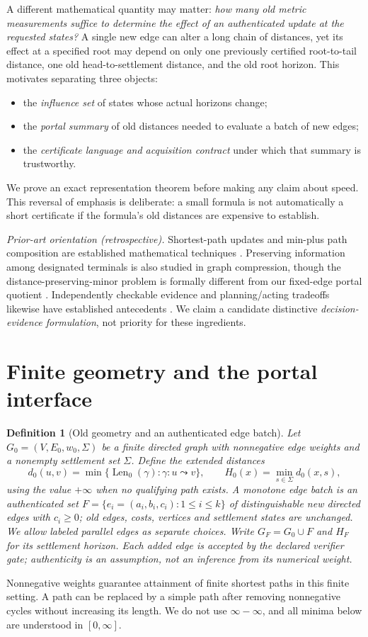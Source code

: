 \documentclass[11pt,letterpaper]{article}
\newtheorem{definition}[theorem]{Definition}
\newcommand{\INF}{+\infty}
\begin{document}
A different mathematical quantity may matter: \emph{how many old metric measurements suffice to determine the effect of an authenticated update at the requested states?} A single new edge can alter a long chain of distances, yet its effect at a specified root may depend on only one previously certified root-to-tail distance, one old head-to-settlement distance, and the old root horizon. This motivates separating three objects:
\begin{itemize}
\item the \emph{influence set} of states whose actual horizons change;
\item the \emph{portal summary} of old distances needed to evaluate a batch of new edges;
\item the \emph{certificate language and acquisition contract} under which that summary is trustworthy.
\end{itemize}
We prove an exact representation theorem before making any claim about speed. This reversal of emphasis is deliberate: a small formula is not automatically a short certificate if the formula's old distances are expensive to establish.

\textit{Prior-art orientation (retrospective).} Shortest-path updates and min-plus path composition are established mathematical techniques \cite{Bellman,Mohri,Dynamic,Demetrescu}. Preserving information among designated terminals is also studied in graph compression, though the distance-preserving-minor problem is formally different from our fixed-edge portal quotient \cite{Krauthgamer}. Independently checkable evidence and planning/acting tradeoffs likewise have established antecedents \cite{Necula,Mugdan,Shekhar,Russell}. We claim a candidate distinctive \emph{decision-evidence formulation}, not priority for these ingredients.

\section{Finite geometry and the portal interface}
\begin{definition}[Old geometry and an authenticated edge batch]\label{def:setup}
Let $G_0=(V,E_0,w_0,\Sigma)$ be a finite directed graph with nonnegative edge weights and a nonempty settlement set $\Sigma$. Define the extended distances
\[
 d_0(u,v)=\min\{\operatorname{Len}_0(\gamma):\gamma:u\leadsto v\},\qquad
 H_0(x)=\min_{s\in\Sigma} d_0(x,s),
\]
using the value $\INF$ when no qualifying path exists. A \emph{monotone edge batch} is an authenticated set $F=\{e_i=(a_i,b_i,c_i):1\le i\le k\}$ of distinguishable new directed edges with $c_i\ge0$; old edges, costs, vertices and settlement states are unchanged. We allow labeled parallel edges as separate choices. Write $G_F=G_0\cup F$ and $H_F$ for its settlement horizon. Each added edge is accepted by the declared verifier gate; authenticity is an assumption, not an inference from its numerical weight.
\end{definition}
Nonnegative weights guarantee attainment of finite shortest paths in this finite setting. A path can be replaced by a simple path after removing nonnegative cycles without increasing its length. We do not use $\infty-\infty$, and all minima below are understood in $[0,\infty]$.
\end{document}
